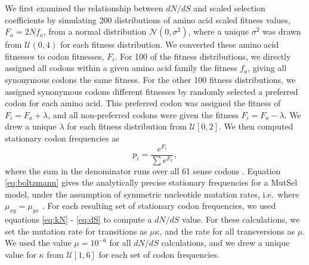 \documentclass{pnastwo}
\begin{document}
\begin{article}
We first examined the relationship between $dN/dS$ and scaled selection coefficients by simulating 200 distributions of amino acid scaled fitness values, $F_a = 2Nf_a$, from a normal distribution $\mathcal{N}(0,\sigma^2)$, where a unique $\sigma^2$ was drawn from $\mathcal{U}(0,4)$ for each fitness distribution. We converted these amino acid fitnesses to codon fitnesses, $F_i$. For 100 of the fitness distributions, we directly assigned all codons within a given amino acid family the fitness $f_a$, giving all synonymous codons the same fitness. For the other 100 fitness distributions, we assigned synonymous codons different fitnesses by randomly selected a preferred codon for each amino acid. This preferred codon was assigned the fitness of $F_i = F_a + \lambda$, and all non-preferred codons were given the fitness $F_i = F_a - \lambda$. We drew a unique $\lambda$ for each fitness distribution from $\mathcal{U}[0,2]$. 
We then computed stationary codon frequencies as 
\begin{equation}\label{eq:boltzmann}
p_i = \frac{e^{F_i}}{\sum e^{F_k}}, 
\end{equation} where the sum in the denominator runs over all 61 sense codons \cite{SellaHirsh2005}. Equation \eqref{eq:boltzmann} gives the analytically precise stationary frequencies for a MutSel model, under the assumption of symmetric nucleotide mutation rates, i.e.\ where $\mu_{xy} = \mu_{yx}$ \cite{SellaHirsh2005}. For each resulting set of stationary codon frequencies, we used equations \eqref{eq:kN} - \eqref{eq:dS} to compute a $dN/dS$ value. For these calculations, we set the mutation rate for transitions as $\mu\kappa$, and the rate for all transversions as $\mu$. We used the value $\mu = 10^{-6}$ for all $dN/dS$ calculations, and we drew a unique value for $\kappa$ from $\mathcal{U}[1,6]$ for each set of codon frequencies.



\end{article}
\end{document}
